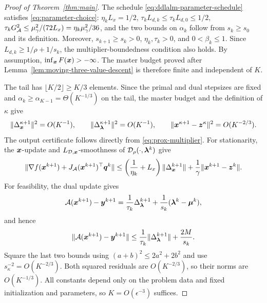 \begin{proof}[Proof of Theorem~\ref{thm:main}]
The schedule \eqref{eq:ddlalm-parameter-schedule} satisfies
\eqref{eq:parameter-choice}: $\eta_kL_x=1/2$,
$\tau_kL_{d,k}\le\tau_kL_{d,0}\le1/2$,
$\tau_kG_{\cal A}^2\le\mu_\gamma^2/(72L_x)
=\eta_k\mu_\gamma^2/36$, and the two bounds on $\alpha_k$ follow
from $s_k\ge s_0$ and its definition. Moreover,
$s_{k+1}\ge s_k>0$, $\eta_k,\tau_k>0$, and
$0<\beta_k\le1$. Since $L_{d,k}\ge1/\rho+1/s_k$,
the multiplier-boundedness condition also holds.
By assumption, $\inf_{\bm{x}}F(\bm{x})>-\infty$. The master budget proved after
Lemma~\ref{lem:moving-three-value-descent} is therefore finite and
independent of $K$.

The tail has $\lfloor K/2\rfloor\ge K/3$ elements. Since the primal
and dual stepsizes are fixed and
$\alpha_k\ge\alpha_{K-1}=\Theta(K^{-1/3})$ on the tail, the master
budget and the definition of $\kappa$ give
\[
\|\Delta_{\bm{x}}^{\kappa+1}\|^2=O(K^{-1}),\qquad
\|\Delta_{\bm{\lambda}}^{\kappa+1}\|^2=O(K^{-1}),\qquad
\|\bm{x}^{\kappa+1}-\bm{z}^\kappa\|^2=O(K^{-2/3}).
\]
The output certificate follows directly from
\eqref{eq:prox-multiplier}. For stationarity, the $\bm{x}$-update
and $L_{\mathcal{D},\bm{x}}$-smoothness of $\mathcal D_\rho(\cdot,\bm{\lambda}^k)$ give
\[
\|\nabla f(\bm{x}^{k+1})+J_{\cal A}(\bm{x}^{k+1})^\top\bm{q}^k\|
\le\left(\frac1{\eta_k}+L_x\right)\|\Delta_{\bm{x}}^{k+1}\|
+\frac1\gamma\|\bm{x}^{k+1}-\bm{z}^k\|.
\]
For feasibility, the dual update gives
\[
{\cal A}(\bm{x}^{k+1})-\bm{y}^{k+1}
=\frac1{\tau_k}\Delta_{\bm{\lambda}}^{k+1}
+\frac1{s_k}(\bm{\lambda}^k-\bm{\mu}^k),
\]
and hence
\[
\|{\cal A}(\bm{x}^{k+1})-\bm{y}^{k+1}\|
\le\frac1{\tau_k}\|\Delta_{\bm{\lambda}}^{k+1}\|+\frac{2M}{s_k}.
\]
Square the last two bounds using $(a+b)^2\le2a^2+2b^2$ and use
$s_\kappa^{-2}=O(K^{-2/3})$. Both squared residuals are
$O(K^{-2/3})$, so their norms are $O(K^{-1/3})$. All constants depend
only on the problem data and fixed initialization and parameters, so
$K=O(\epsilon^{-3})$ suffices.
\end{proof}
